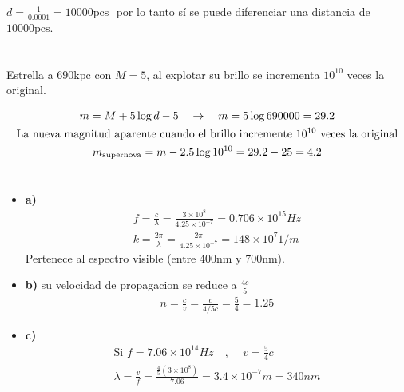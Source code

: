 \documentclass{article}
\begin{document}
\section{}
$ d = \frac{1 }{0.0001 } = 10000 \text{pcs }$ por lo tanto sí se puede diferenciar una distancia de $ 10000 \text{pcs} $.





\section{}
Estrella a $ 690 \text{kpc} $ con $ M = 5  $, al explotar su brillo se incrementa $ 10 ^ {10 } $ veces la original.

\begin{gather*}
  m = M + 5 \log{d } - 5 \quad \rightarrow \quad m = 5 \log{690000} = 29.2 \\
  \text{La nueva magnitud aparente cuando el brillo incremente $ 10^{10}  $ veces la original}\\
  m _{\text{supernova}} = m - 2.5 \log{10 ^ {10 } } = 29.2 - 25 = 4.2
\end{gather*}



\section{}
\begin{itemize}
  \item \textbf{a) } 
    \begin{gather*}
      f = \frac{c }{\lambda} = \frac{3 \times10^{8 }}{4.25 \times10^{-7 }} = 0.706 \times10^{15 } Hz \\
      k = \frac{2\pi }{\lambda} = \frac{2 \pi }{4.25 \times10^{-7 }} = 148 \times10^{7 } 1/m
    \end{gather*}
    Pertenece al espectro visible (entre 400nm y 700nm).
  \item \textbf{b) } su velocidad de propagacion se reduce a $ \frac{4c }{5 } $
    \begin{gather*}
      n = \frac{c }{ v } = \frac{c }{4/5 c } = \frac{5}{4} = 1.25 
    \end{gather*}
  \item \textbf{c) } 
    \begin{gather*}
      \text{Si } f = 7.06 \times10^{14 } Hz \quad \text{, }\quad v = \frac{5 }{4 } c \\
      \lambda = \frac{v}{f} = \frac{\frac{4}{5 } (3 \times10^{8 })}{7.06 } = 3.4 \times10^{-7 }m = 340 nm
    \end{gather*}
\end{itemize}
\end{document}
